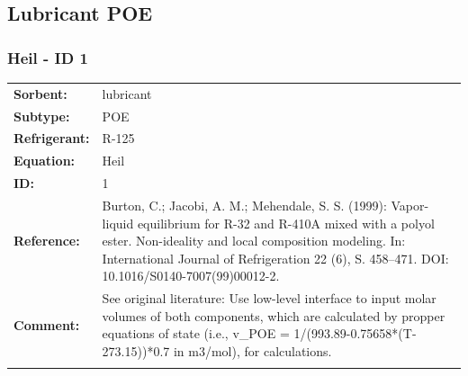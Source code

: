 \subsection{Lubricant POE}
%
\subsubsection{Heil - ID 1}
%
\begin{tabular}[l]{|lp{11.5cm}|}
\hline
\addlinespace

\textbf{Sorbent:} & lubricant \\
\textbf{Subtype:} & POE \\
\textbf{Refrigerant:} & R-125 \\
\textbf{Equation:} & Heil \\
\textbf{ID:} & 1 \\
\textbf{Reference:} & Burton, C.; Jacobi, A. M.; Mehendale, S. S. (1999): Vapor-liquid equilibrium for R-32 and R-410A mixed with a polyol ester. Non-ideality and local composition modeling. In: International Journal of Refrigeration 22 (6), S. 458–471. DOI: 10.1016/S0140-7007(99)00012-2. \\
\textbf{Comment:} & See original literature: Use low-level interface to input molar volumes of both components, which are calculated by propper equations of state (i.e., v\_POE =  1/(993.89-0.75658*(T-273.15))*0.7 in m3/mol), for calculations. \\

\addlinespace
\hline
\end{tabular}
\newline

